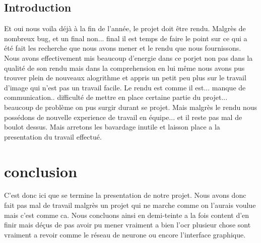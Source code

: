 \documentclass[12pt]{article}
\begin{document}
\subsection{Introduction}
Et oui nous voila déjà à la fin de l'année, le projet doit être rendu. Malgrès de nombreux bug, et un final non... final il est temps de faire le point sur ce qui a été fait les recherche que nous avons mener et le rendu que nous fournissons. Nous avons effectivement mis beaucoup d'energie dans ce porjet non pas dans la qualité de son rendu mais dans la comprehension en lui même nous avons pus trouver plein de nouveaux alogrithme et appris un petit peu plus sur le travail d'image qui n'est pas un travail facile. Le rendu est comme il est... manque de communication.. difficulté de mettre en place certaine partie du projet... beaucoup de problème on pus surgir durant se projet. Mais malgrès le rendu nous possédons de nouvelle experience de travail en équipe... et il reste pas mal de boulot dessus. Mais arretons les bavardage inutile et laisson place a la presentation du travail effectué.






\section{conclusion}
C'est donc ici que se termine la presentation de notre projet. Nous avons donc fait pas mal de travail malgrès un projet qui ne marche comme on l'aurais voulue mais c'est comme ca. Nous concluons ainsi en demi-teinte a la fois content d'en finir mais déçus de pas avoir pu mener vraiment a bien l'ocr plusieur chose sont vraiment a revoir comme le réseau de neurone ou encore l'interface graphique.
\end{document}
